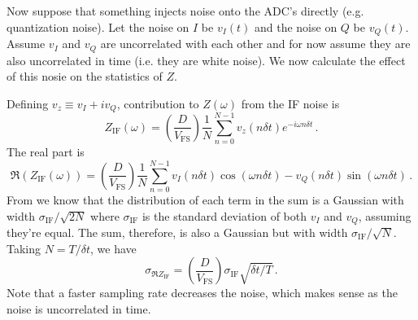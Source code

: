 
Now suppose that something injects noise onto the ADC's directly (e.g. quantization noise).
Let the noise on $I$ be $v_I(t)$ and the noise on $Q$ be $v_Q(t)$.
Assume $v_I$ and $v_Q$ are uncorrelated with each other and for now assume they are also uncorrelated in time (i.e. they are white noise).
We now calculate the effect of this nosie on the statistics of $Z$.

Defining $v_z \equiv v_I + i v_Q$, contribution to $Z(\omega)$ from the IF noise is
\begin{equation}
  Z_\text{IF}(\omega) = \left( \frac{D}{V_\text{FS}} \right) \frac{1}{N}
  \sum_{n=0}^{N-1} v_z(n \delta t) e^{-i \omega n \delta t}
  \, .
\end{equation}
The real part is
\begin{equation}
  \Re \left( Z_\text{IF} (\omega) \right) = \left( \frac{D}{V_\text{FS}} \right)
  \frac{1}{N}
  \sum_{n=0}^{N-1}
      v_I(n \delta t) \cos(\omega n \delta t)
    - v_Q(n \delta t) \sin(\omega n \delta t)
  \, .
\end{equation}
From \cite{Sank:whiteNoiseDFT} we know that the distribution of each term in the sum is a Gaussian with width $\sigma_\text{IF} / \sqrt{2N}$ where $\sigma_\text{IF}$ is the standard deviation of both $v_I$ and $v_Q$, assuming they're equal.
The sum, therefore, is also a Gaussian but with width $\sigma_\text{IF} / \sqrt{N}$.
Taking $N = T / \delta t$, we have
\begin{equation}
  \sigma_{\Re Z_\text{IF}}
  = \left( \frac{D}{V_\text{FS}} \right)
    \sigma_\text{IF} \sqrt{\delta t / T} \, .
\end{equation}
Note that a faster sampling rate decreases the noise, which makes sense as the noise is uncorrelated in time.
